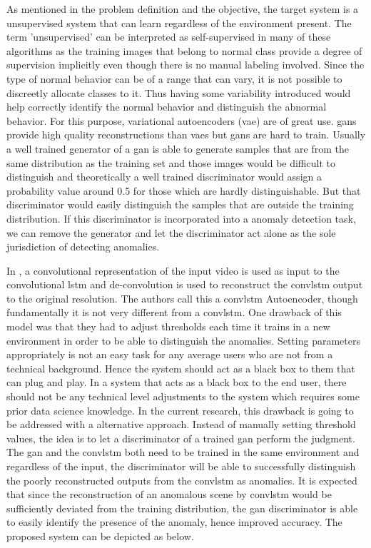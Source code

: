 \documentclass[a4paper,12pt]{report}
\begin{document}
\begin{itemize}
As mentioned in the problem definition and the objective, the target system is a unsupervised system that can learn regardless of the environment present. The term 'unsupervised' can be interpreted as self-supervised in many of these algorithms as the training images that belong to normal class provide a degree of supervision implicitly even though there is no manual labeling involved. 
Since the type of normal behavior can be of a range that can vary, it is not possible to discreetly allocate classes to it. Thus having some variability introduced would help correctly identify the normal behavior and distinguish the abnormal behavior. For this purpose, variational autoencoders (\gls{vae}) are of great use. \gls{gan}s provide high quality reconstructions than \gls{vae}s but \gls{gan}s are hard to train. Usually a well trained generator of a \gls{gan} is able to generate samples that are from the same distribution as the training set and those images would be difficult to distinguish and theoretically a well trained discriminator would assign a probability value around 0.5 for those which are hardly distinguishable. But that discriminator would easily distinguish the samples that are outside the training distribution. If this discriminator is incorporated into a anomaly detection task, we can remove the generator and let the discriminator act alone as the sole jurisdiction of detecting anomalies. 

In \cite{54}, a convolutional representation of the input video is used as input to the convolutional \gls{lstm} and de-convolution is used to reconstruct the \gls{convlstm} output to the original resolution. The authors call this a \gls{convlstm} Autoencoder, though fundamentally it is not very different from a \gls{convlstm}. One drawback of this model was that they had to adjust thresholds each time it trains in a new environment in order to be able to distinguish the anomalies. Setting parameters appropriately is not an easy task for any average users who are not from a technical background. Hence the system should act as a black box to them that can plug and play. In a system that acts as a black box to the end user, there should not be any technical level adjustments to the system which requires some prior data science knowledge. In the current research, this drawback is going to be addressed with a alternative approach. Instead of manually setting threshold values, the idea is to let a discriminator of a trained \gls{gan} perform the judgment. The \gls{gan} and the \gls{convlstm} both need to be trained in the same environment and regardless of the input, the discriminator will be able to successfully distinguish the poorly reconstructed outputs from the \gls{convlstm} as anomalies. It is expected that since the reconstruction of an anomalous scene by \gls{convlstm} would be sufficiently deviated from the training distribution, the \gls{gan} discriminator is able to easily identify the presence of the anomaly, hence improved accuracy. The proposed system can be depicted as below.


\end{itemize}
\end{document}

